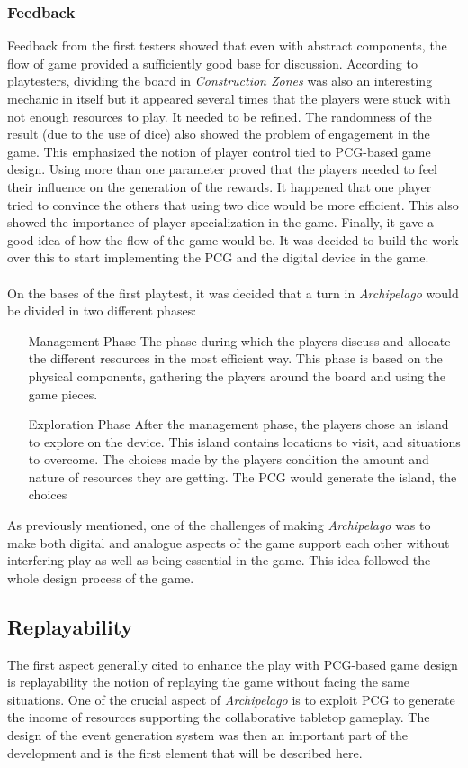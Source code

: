 \subsubsection{Feedback}
Feedback from the first testers showed that even with abstract components, the flow of game provided a sufficiently good base for discussion. According to playtesters, dividing the board in \textit{Construction Zones} was also an interesting mechanic in itself but it appeared several times that the players were stuck with not enough resources to play. It needed to be refined. The randomness of the result (due to the use of dice) also showed the problem of engagement in the game. This emphasized the notion of player control tied to PCG-based game design. Using more than one parameter proved that the players needed to feel their influence on the generation of the rewards. It happened that one player tried to convince the others that using two dice would be more efficient. This also showed the importance of player specialization in the game. 
Finally, it gave a good idea of how the flow of the game would be. It was decided to build the work over this to start implementing the PCG and the digital device in the game.\\\\

On the bases of the first playtest, it was decided that a turn in \textit{Archipelago} would be divided in two different phases:
\begin{itemize}
\item[Management Phase] The phase during which the players discuss and allocate the different resources in the most efficient way. This phase is based on the physical components, gathering the players around the board and using the game pieces.
\item[Exploration Phase] After the management phase, the players chose an island to explore on the device. This island contains locations to visit, and situations to overcome. The choices made by the players condition the amount and nature of resources they are getting. The PCG would generate the island, the choices 
\end{itemize}
As previously mentioned, one of the challenges of making \textit{Archipelago} was to make both digital and analogue aspects of the game support each other without interfering play as well as being essential in the game. This idea followed the whole design process of the game.
\subsection{Replayability}
The first aspect generally cited to enhance the play with PCG-based game design is replayability  the notion of replaying the game without facing the same situations. One of the crucial aspect of \textit{Archipelago} is to exploit PCG to generate the income of resources supporting the collaborative tabletop gameplay. The design of the event generation system was then an important part of the development and is the first element that will be described here.
